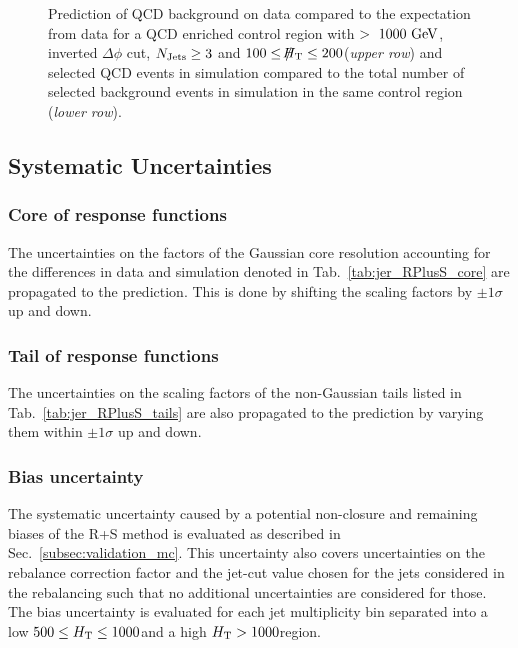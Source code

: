\begin{figure}[!t]
\begin{tabular}{cc}
  \end{tabular}
  \caption{Prediction of QCD background on data compared to the expectation from data for a QCD enriched control region with \HT$>~1000~\rm{GeV}$, inverted $\Delta \phi$ cut, $N_{\text{Jets}} \geq 3$ and $100 \leq \slash\mkern-12mu{H}_{\text{T}} \leq 200$\gev (\textit{upper row}) and selected QCD events in simulation compared to the total number of selected background events in simulation in the same control region (\textit{lower row}).}
  \label{fig:qcd_rs_dataclosure}
\end{figure}

\subsection{Systematic Uncertainties}
\label{subsec:RA2_syst_unc}
\subsubsection*{Core of response functions} The uncertainties on the factors of the Gaussian core resolution accounting for the differences in data and simulation denoted in Tab.~\ref{tab:jer_RPlusS_core} are propagated to the prediction. This is done by shifting the scaling factors by $\pm 1\sigma$ up and down. 
\subsubsection*{Tail of response functions} The uncertainties on the scaling factors of the non-Gaussian tails listed in Tab.~\ref{tab:jer_RPlusS_tails} are also propagated to the prediction by varying them within $\pm 1\sigma$ up and down. 
\subsubsection*{Bias uncertainty} The systematic uncertainty caused by a potential non-closure and remaining biases of the R+S method is evaluated as described in Sec.~\ref{subsec:validation_mc}. This uncertainty also covers uncertainties on the rebalance correction factor and the jet-\pt cut value chosen for the jets considered in the rebalancing such that no additional uncertainties are considered for those. The bias uncertainty is evaluated for each jet multiplicity bin separated into a low $ 500 \leq H_{\text{T}} \leq 1000$\gev and a high $H_{\text{T}} > 1000$\gev region.
